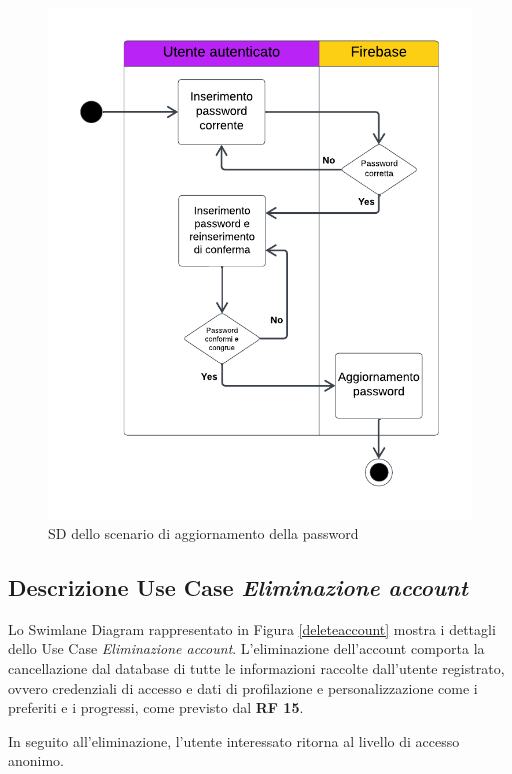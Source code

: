 \documentclass[11pt, a4paper]{article}
\theoremstyle{definition} %
\begin{document}
\begin{figure}[H]
\centering
\hspace*{-0.7cm}
\includegraphics[scale = 1]{materiale/ucdiagrams/swimlanepassword.pdf}
\caption{SD dello scenario di aggiornamento della password}
\label{slpassword}
\end{figure}

\newpage
\subsection*{Descrizione Use Case \textit{Eliminazione account}}
Lo Swimlane Diagram rappresentato in Figura \ref{deleteaccount} mostra
i dettagli dello Use Case \textit{Eliminazione account}. L'eliminazione
dell'account comporta la cancellazione dal database di tutte le informazioni
raccolte dall'utente registrato, ovvero credenziali di accesso e dati
di profilazione e personalizzazione come i preferiti e i progressi, come
previsto dal \textbf{RF 15}.

In seguito all'eliminazione, l'utente interessato ritorna al livello di
accesso anonimo.
\end{document}
